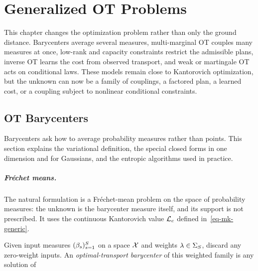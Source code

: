 
\chapter{Generalized OT Problems}
\label{sec-generalized-ot-problems}

This chapter changes the optimization problem rather than only the ground distance. Barycenters average several measures, multi-marginal OT couples many measures at once, low-rank and capacity constraints restrict the admissible plans, inverse OT learns the cost from observed transport, and weak or martingale OT acts on conditional laws. These models remain close to Kantorovich optimization, but the unknown can now be a family of couplings, a factored plan, a learned cost, or a coupling subject to nonlinear conditional constraints.

\section{OT Barycenters}
\label{sec-barycenters}

Barycenters ask how to average probability measures rather than points. This section explains the variational definition, the special closed forms in one dimension and for Gaussians, and the entropic algorithms used in practice.

\paragraph{Fr\'echet means.}

The natural formulation is a Fr\'echet-mean problem on the space of probability measures: the unknown is the barycenter measure itself, and its support is not prescribed. It uses the continuous Kantorovich value $\mathcal{L}_c$ defined in~\eqref{eq-mk-generic}.

\begin{defn}\label{def-ot-barycenter}
Given input measures $(\beta_s)_{s=1}^S$ on a space $\mathcal{X}$ and weights $\lambda\in\Sigma_S$, discard any zero-weight inputs. An \emph{optimal-transport barycenter} of this weighted family is any solution of
\end{defn}

